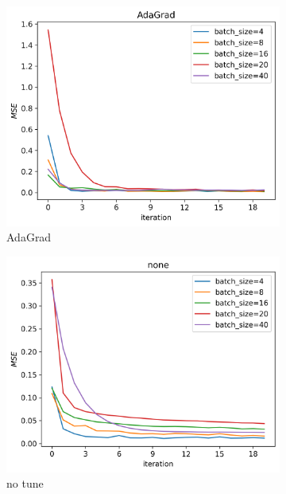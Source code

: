 \documentclass[11pt]{article}
\begin{document}
\begin{figure}[H]
    \begin{subfigure}{.5\textwidth}
        \centering
        \includegraphics[width=.9\textwidth]{../figures/SGD_batch_size_AdaGrad.png}
        \caption{AdaGrad}
        \label{fig:}
    \end{subfigure}
    \begin{subfigure}{.5\textwidth}
        \centering
        \includegraphics[width=.9\textwidth]{../figures/SGD_batch_size_none.png}
        \caption{no tune}
        \label{fig:}
    \end{subfigure}
    \begin{subfigure}{.5\textwidth}
        \centering

\end{subfigure}
\end{figure}
\end{document}
